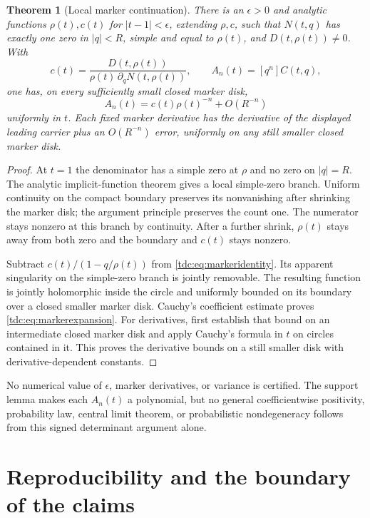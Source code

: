 \documentclass[11pt]{article}
\newtheorem{theorem}{Theorem}[section]
\theoremstyle{definition}\newtheorem{definition}[theorem]{Definition}
\theoremstyle{remark}\newtheorem{remark}[theorem]{Remark}
\begin{document}
\begin{theorem}[Local marker continuation]\label{tdc:thm:marker}
There is an $\epsilon>0$ and analytic functions $\rho(t),c(t)$ for $|t-1|<\epsilon$, extending $\rho,c$, such that $N(t,q)$ has exactly one zero in $|q|<R$, simple and equal to $\rho(t)$, and $D(t,\rho(t))\ne0$. With
\[
 c(t)=\frac{D(t,\rho(t))}{\rho(t)\,\partial_q N(t,\rho(t))},
 \qquad A_n(t)=[q^n]C(t,q),
\]
one has, on every sufficiently small closed marker disk,
\begin{equation}\label{tdc:eq:markerexpansion}
 A_n(t)=c(t)\rho(t)^{-n}+O(R^{-n})
\end{equation}
uniformly in $t$. Each fixed marker derivative has the derivative of the displayed leading carrier plus an $O(R^{-n})$ error, uniformly on any still smaller closed marker disk.
\end{theorem}
\begin{proof}
At $t=1$ the denominator has a simple zero at $\rho$ and no zero on $|q|=R$. The analytic implicit-function theorem gives a local simple-zero branch. Uniform continuity on the compact boundary preserves its nonvanishing after shrinking the marker disk; the argument principle preserves the count one. The numerator stays nonzero at this branch by continuity. After a further shrink, $\rho(t)$ stays away from both zero and the boundary and $c(t)$ stays nonzero.

Subtract $c(t)/(1-q/\rho(t))$ from \eqref{tdc:eq:markeridentity}. Its apparent singularity on the simple-zero branch is jointly removable. The resulting function is jointly holomorphic inside the circle and uniformly bounded on its boundary over a closed smaller marker disk. Cauchy's coefficient estimate proves \eqref{tdc:eq:markerexpansion}. For derivatives, first establish that bound on an intermediate closed marker disk and apply Cauchy's formula in $t$ on circles contained in it. This proves the derivative bounds on a still smaller disk with derivative-dependent constants.
\end{proof}

No numerical value of $\epsilon$, marker derivatives, or variance is certified. The support lemma makes each $A_n(t)$ a polynomial, but no general coefficientwise positivity, probability law, central limit theorem, or probabilistic nondegeneracy follows from this signed determinant argument alone.

\section{Reproducibility and the boundary of the claims}
\label{tdc:sec:repro}
\end{document}
